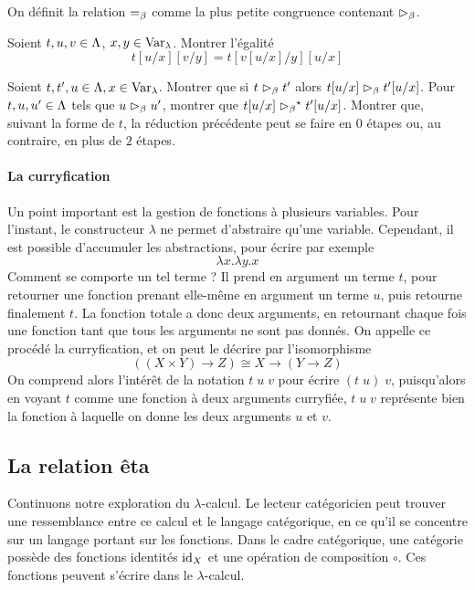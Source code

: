 \begin{definition}
  On définit la relation $\Beq$ comme la plus petite congruence contenant
  $\mathrel{\rhd_{\beta}}$.
  \index[notation]{$\Beq$}
\end{definition}

\begin{exercise}\label{exo.subst.subst}
  Soient $t,u,v \in \Lambda$, $x,y\in \operatorname{Var}_{\lambda}$. Montrer l'égalité
  \[t[u/x][v/y] = t[v[u/x]/y][u/x]\]
\end{exercise}

\begin{exercise}\label{exo.subst.red}
  Soient $t,t',u\in\Lambda, x \in \operatorname{Var}_{\lambda}$. Montrer que si $t\mathrel{\rhd_{\beta}} t'$ alors
  $t[u/x] \mathrel{\rhd_{\beta}} t'[u/x]$. Pour $t,u,u'\in\Lambda$ tels que $u \mathrel{\rhd_{\beta}} u'$,
  montrer que $t[u/x] \mathrel{\rhd_{\beta}}^{\mathord{\star}} t'[u/x]$. Montrer que, suivant la forme de
  $t$, la réduction précédente peut se faire en $0$ étapes ou, au contraire,
  en plus de $2$ étapes.
\end{exercise}

\paragraph{La curryfication}
Un point important est la gestion de fonctions à plusieurs variables. Pour
l'instant, le constructeur $\lambda$ ne permet d'abstraire qu'une variable.
Cependant, il est possible d'accumuler les abstractions, pour écrire par exemple
\[\lambda x.\lambda y.x\]
Comment se comporte un tel terme ? Il prend en argument un terme $t$, pour
retourner une fonction prenant elle-même en argument un terme $u$, puis
retourne finalement $t$. La fonction totale a donc deux arguments, en retournant
chaque fois une fonction tant que tous les arguments ne sont pas donnés. On
appelle ce procédé la curryfication, et on peut le décrire par l'isomorphisme
\[((X\times Y) \to Z)\cong X \to (Y \to Z)\]
On comprend alors l'intérêt de la notation $t\;u\;v$ pour écrire $(t\;u)\;v$,
puisqu'alors en voyant $t$ comme une fonction à deux arguments curryfiée,
$t\;u\;v$ représente bien la fonction à laquelle on donne les deux arguments
$u$ et $v$.

\subsection{La relation êta}

Continuons notre exploration du $\lambda$-calcul. Le lecteur catégoricien
peut trouver une ressemblance entre ce calcul et le langage catégorique, en ce
qu'il se concentre sur un langage portant sur les fonctions. Dans le cadre
catégorique, une catégorie possède des fonctions identités $\operatorname{id}_X$ et une
opération de composition $\circ$. Ces fonctions peuvent s'écrire dans le
$\lambda$-calcul.

